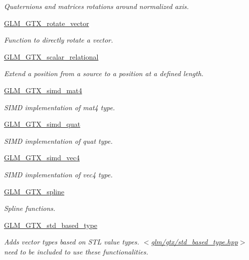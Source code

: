 \begin{DoxyCompactItemize}
\begin{DoxyCompactList}\small\item\em Quaternions and matrices rotations around normalized axis. \end{DoxyCompactList}\item 
\hyperlink{group__gtx__rotate__vector}{G\+L\+M\+\_\+\+G\+T\+X\+\_\+rotate\+\_\+vector}
\begin{DoxyCompactList}\small\item\em Function to directly rotate a vector. \end{DoxyCompactList}\item 
\hyperlink{group__gtx__scalar__relational}{G\+L\+M\+\_\+\+G\+T\+X\+\_\+scalar\+\_\+relational}
\begin{DoxyCompactList}\small\item\em Extend a position from a source to a position at a defined length. \end{DoxyCompactList}\item 
\hyperlink{group__gtx__simd__mat4}{G\+L\+M\+\_\+\+G\+T\+X\+\_\+simd\+\_\+mat4}
\begin{DoxyCompactList}\small\item\em S\+I\+MD implementation of mat4 type. \end{DoxyCompactList}\item 
\hyperlink{group__gtx__simd__quat}{G\+L\+M\+\_\+\+G\+T\+X\+\_\+simd\+\_\+quat}
\begin{DoxyCompactList}\small\item\em S\+I\+MD implementation of quat type. \end{DoxyCompactList}\item 
\hyperlink{group__gtx__simd__vec4}{G\+L\+M\+\_\+\+G\+T\+X\+\_\+simd\+\_\+vec4}
\begin{DoxyCompactList}\small\item\em S\+I\+MD implementation of vec4 type. \end{DoxyCompactList}\item 
\hyperlink{group__gtx__spline}{G\+L\+M\+\_\+\+G\+T\+X\+\_\+spline}
\begin{DoxyCompactList}\small\item\em Spline functions. \end{DoxyCompactList}\item 
\hyperlink{group__gtx__std__based__type}{G\+L\+M\+\_\+\+G\+T\+X\+\_\+std\+\_\+based\+\_\+type}
\begin{DoxyCompactList}\small\item\em Adds vector types based on S\+TL value types. $<$\hyperlink{std__based__type_8hpp}{glm/gtx/std\+\_\+based\+\_\+type.\+hpp}$>$ need to be included to use these functionalities. \end{DoxyCompactList}\item 

\end{DoxyCompactItemize}
